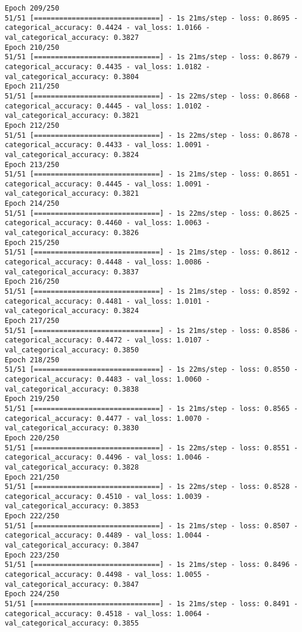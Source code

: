 \begin{lstlisting}
Epoch 209/250
51/51 [==============================] - 1s 21ms/step - loss: 0.8695 - categorical_accuracy: 0.4424 - val_loss: 1.0166 - val_categorical_accuracy: 0.3827
Epoch 210/250
51/51 [==============================] - 1s 21ms/step - loss: 0.8679 - categorical_accuracy: 0.4435 - val_loss: 1.0182 - val_categorical_accuracy: 0.3804
Epoch 211/250
51/51 [==============================] - 1s 22ms/step - loss: 0.8668 - categorical_accuracy: 0.4445 - val_loss: 1.0102 - val_categorical_accuracy: 0.3821
Epoch 212/250
51/51 [==============================] - 1s 22ms/step - loss: 0.8678 - categorical_accuracy: 0.4433 - val_loss: 1.0091 - val_categorical_accuracy: 0.3824
Epoch 213/250
51/51 [==============================] - 1s 21ms/step - loss: 0.8651 - categorical_accuracy: 0.4445 - val_loss: 1.0091 - val_categorical_accuracy: 0.3821
Epoch 214/250
51/51 [==============================] - 1s 22ms/step - loss: 0.8625 - categorical_accuracy: 0.4460 - val_loss: 1.0063 - val_categorical_accuracy: 0.3826
Epoch 215/250
51/51 [==============================] - 1s 21ms/step - loss: 0.8612 - categorical_accuracy: 0.4448 - val_loss: 1.0086 - val_categorical_accuracy: 0.3837
Epoch 216/250
51/51 [==============================] - 1s 21ms/step - loss: 0.8592 - categorical_accuracy: 0.4481 - val_loss: 1.0101 - val_categorical_accuracy: 0.3824
Epoch 217/250
51/51 [==============================] - 1s 21ms/step - loss: 0.8586 - categorical_accuracy: 0.4472 - val_loss: 1.0107 - val_categorical_accuracy: 0.3850
Epoch 218/250
51/51 [==============================] - 1s 22ms/step - loss: 0.8550 - categorical_accuracy: 0.4483 - val_loss: 1.0060 - val_categorical_accuracy: 0.3838
Epoch 219/250
51/51 [==============================] - 1s 21ms/step - loss: 0.8565 - categorical_accuracy: 0.4477 - val_loss: 1.0070 - val_categorical_accuracy: 0.3830
Epoch 220/250
51/51 [==============================] - 1s 22ms/step - loss: 0.8551 - categorical_accuracy: 0.4496 - val_loss: 1.0046 - val_categorical_accuracy: 0.3828
Epoch 221/250
51/51 [==============================] - 1s 22ms/step - loss: 0.8528 - categorical_accuracy: 0.4510 - val_loss: 1.0039 - val_categorical_accuracy: 0.3853
Epoch 222/250
51/51 [==============================] - 1s 21ms/step - loss: 0.8507 - categorical_accuracy: 0.4489 - val_loss: 1.0044 - val_categorical_accuracy: 0.3847
Epoch 223/250
51/51 [==============================] - 1s 21ms/step - loss: 0.8496 - categorical_accuracy: 0.4498 - val_loss: 1.0055 - val_categorical_accuracy: 0.3847
Epoch 224/250
51/51 [==============================] - 1s 21ms/step - loss: 0.8491 - categorical_accuracy: 0.4518 - val_loss: 1.0064 - val_categorical_accuracy: 0.3855

\end{lstlisting}
